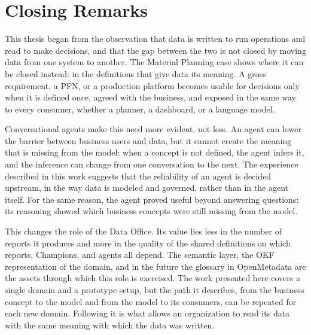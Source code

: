 \section{Closing Remarks}
\label{sec:conclusions_closing}

This thesis began from the observation that data is written to run operations and read to make decisions, and that the gap between the two is not closed by moving data from one system to another. The Material Planning case shows where it can be closed instead: in the definitions that give data its meaning. A gross requirement, a PFN, or a production platform becomes usable for decisions only when it is defined once, agreed with the business, and exposed in the same way to every consumer, whether a planner, a dashboard, or a language model.

Conversational agents make this need more evident, not less. An agent can lower the barrier between business users and data, but it cannot create the meaning that is missing from the model: when a concept is not defined, the agent infers it, and the inference can change from one conversation to the next. The experience described in this work suggests that the reliability of an agent is decided upstream, in the way data is modeled and governed, rather than in the agent itself. For the same reason, the agent proved useful beyond answering questions: its reasoning showed which business concepts were still missing from the model.

This changes the role of the Data Office. Its value lies less in the number of reports it produces and more in the quality of the shared definitions on which reports, Champions, and agents all depend. The semantic layer, the OKF representation of the domain, and in the future the glossary in OpenMetadata are the assets through which this role is exercised. The work presented here covers a single domain and a prototype setup, but the path it describes, from the business concept to the model and from the model to its consumers, can be repeated for each new domain. Following it is what allows an organization to read its data with the same meaning with which the data was written.
